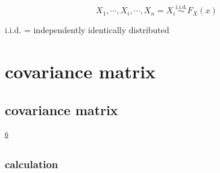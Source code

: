 \documentclass[
]{book}
\theoremstyle{definition}
\theoremstyle{definition}
\theoremstyle{definition}
\theoremstyle{definition}
\theoremstyle{remark}
\begin{document}
\[
X_{{\scriptscriptstyle 1}},\cdots,X_{{\scriptscriptstyle i}},\cdots,X_{{\scriptscriptstyle n}}=X_{{\scriptscriptstyle i}}\overset{\text{i.i.d.}}{\sim}F_{{\scriptscriptstyle X}}\left(x\right)
\]

\(\text{i.i.d.}\) = independently identically distributed

\hypertarget{covariance-matrix}{%
\chapter{covariance matrix}\label{covariance-matrix}}

\hypertarget{covariance-matrix-1}{%
\section{covariance matrix}\label{covariance-matrix-1}}

\textsuperscript{\protect\hyperlink{ref-ccjou2014}{6}}

\hypertarget{calculation}{%
\subsection{calculation}\label{calculation}}
\end{document}
